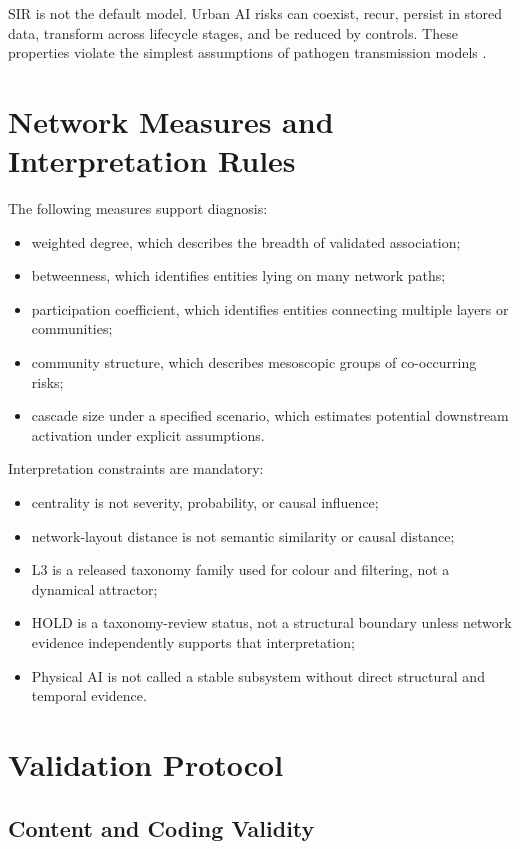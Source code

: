 \documentclass[11pt,a4paper]{article}
\begin{document}
SIR is not the default model. Urban AI risks can coexist, recur, persist in stored data, transform across lifecycle stages, and be reduced by controls. These properties violate the simplest assumptions of pathogen transmission models \cite{pastorsatorras2015,vespignani2012}.

\section{Network Measures and Interpretation Rules}

The following measures support diagnosis:
\begin{itemize}
  \item weighted degree, which describes the breadth of validated association;
  \item betweenness, which identifies entities lying on many network paths;
  \item participation coefficient, which identifies entities connecting multiple layers or communities;
  \item community structure, which describes mesoscopic groups of co-occurring risks;
  \item cascade size under a specified scenario, which estimates potential downstream activation under explicit assumptions.
\end{itemize}

Interpretation constraints are mandatory:
\begin{itemize}
  \item centrality is not severity, probability, or causal influence;
  \item network-layout distance is not semantic similarity or causal distance;
  \item L3 is a released taxonomy family used for colour and filtering, not a dynamical attractor;
  \item HOLD is a taxonomy-review status, not a structural boundary unless network evidence independently supports that interpretation;
  \item Physical AI is not called a stable subsystem without direct structural and temporal evidence.
\end{itemize}

\section{Validation Protocol}

\subsection{Content and Coding Validity}
\end{document}
